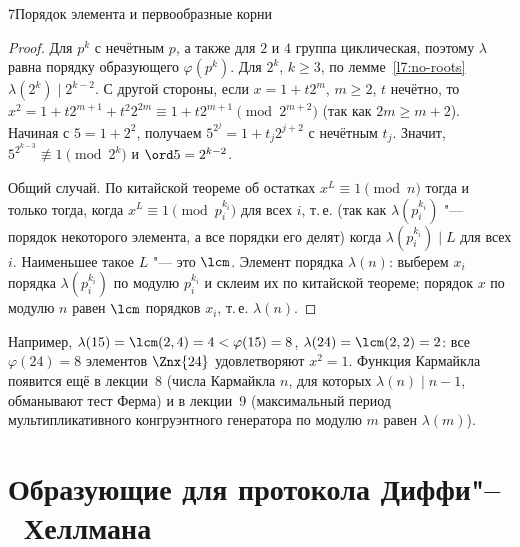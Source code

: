 \begin{lecture}{7}{Порядок элемента и первообразные корни}
\begin{proof}
Для $p^k$ с нечётным $p$, а также для $2$ и $4$ группа циклическая, поэтому $\lambda$ равна
порядку образующего $\varphi(p^k)$. Для $2^k$, $k \ge 3$, по лемме~\ref{l7:no-roots}
$\lambda(2^k) \mid 2^{k-2}$. С другой стороны, если $x = 1 + t 2^m$, $m \ge 2$, $t$ нечётно,
то $x^2 = 1 + t 2^{m+1} + t^2 2^{2m} \equiv 1 + t 2^{m+1} \pmod{2^{m+2}}$ (так как
$2m \ge m + 2$). Начиная с $5 = 1 + 2^2$, получаем $5^{2^j} = 1 + t_j 2^{j+2}$ с нечётным $t_j$. Значит, $5^{2^{k-3}} \not\equiv 1 \pmod{2^k}$
и $\ord 5 = 2^{k-2}$.

Общий случай. По китайской теореме об остатках $x^L \equiv 1 \pmod n$ тогда и только тогда,
когда $x^L \equiv 1 \pmod{p_i^{k_i}}$ для всех $i$, т.\,е. (так как $\lambda(p_i^{k_i})$ "---
порядок некоторого элемента, а все порядки его делят) когда $\lambda(p_i^{k_i}) \mid L$ для
всех $i$. Наименьшее такое $L$ "--- это $\lcm$. Элемент порядка $\lambda(n)$: выберем $x_i$ порядка
$\lambda(p_i^{k_i})$ по модулю $p_i^{k_i}$ и склеим их по китайской теореме; порядок $x$ по
модулю $n$ равен $\lcm$ порядков $x_i$, т.\,е. $\lambda(n)$.
\end{proof}

Например, $\lambda(15) = \lcm(2, 4) = 4 < \varphi(15) = 8$, $\lambda(24) = \lcm(2, 2) = 2$:
все $\varphi(24) = 8$ элементов $\Znx{24}$ удовлетворяют $x^2 = 1$. Функция Кармайкла появится
ещё в лекции~8 (числа Кармайкла $n$, для которых $\lambda(n) \mid n - 1$, обманывают тест
Ферма) и в лекции~9 (максимальный период мультипликативного конгруэнтного генератора по
модулю $m$ равен $\lambda(m)$).


\section{Образующие для протокола Диффи"--~Хеллмана}


\end{lecture}
